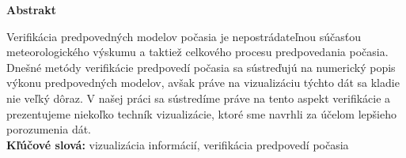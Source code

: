 \begin{Huge}
\textbf{Abstrakt}  \\
\end{Huge}

Verifikácia predpovedných modelov počasia je nepostrádateľnou súčasťou meteorologického výskumu a taktiež celkového procesu predpovedania počasia. Dnešné metódy verifikácie predpovedí počasia sa sústreďujú na numerický popis výkonu predpovedných modelov, avšak práve na vizualizáciu týchto dát sa kladie nie veľký dôraz. V našej práci sa sústredíme práve na tento aspekt verifikácie a prezentujeme niekoľko techník vizualizácie, ktoré sme navrhli za účelom lepšieho porozumenia dát. \\



\noindent\textbf{Kľúčové slová:} vizualizácia informácií, verifikácia predpovedí počasia 